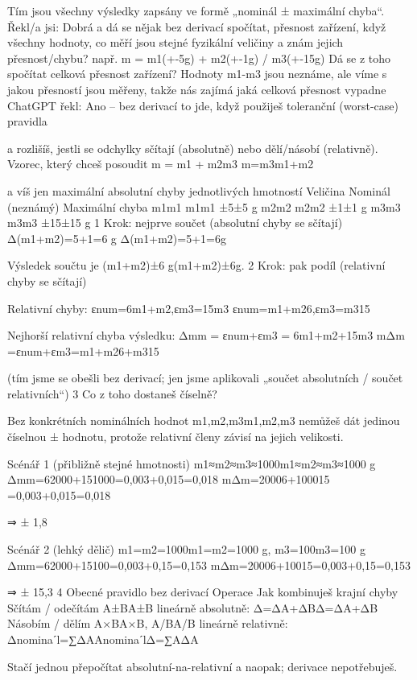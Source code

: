 {Tím jsou všechny výsledky zapsány ve formě „nominál ± maximální chyba“.
Řekl/a jsi:
Dobrá a dá se nějak bez derivací spočítat, přesnost zařízení, když všechny hodnoty, co měří jsou stejné fyzikální veličiny a znám jejich přesnost/chybu? např. m = m1(+-5g) + m2(+-1g) / m3(+-15g) Dá se z toho spočítat celková přesnost zařízení? Hodnoty m1-m3 jsou neznáme, ale víme s jakou přesností jsou měřeny,  takže nás zajímá jaká celková přesnost vypadne
ChatGPT řekl:
Ano – bez derivací to jde, když použiješ toleranční (worst-case) pravidla

a rozlišíš, jestli se odchylky sčítají (absolutně) nebo dělí/násobí (relativně).
Vzorec, který chceš posoudit
m  =  m1  +  m2m3
m=m3​m1​+m2​​

a víš jen maximální absolutní chyby jednotlivých hmotností
Veličina	Nominál (neznámý)	Maximální chyba
m1m1​	m1m1​	±5±5 g
m2m2​	m2m2​	±1±1 g
m3m3​	m3m3​	±15±15 g
1 Krok: nejprve součet (absolutní chyby se sčítají)
Δ(m1+m2)=5+1=6  g
Δ(m1​+m2​)=5+1=6g

Výsledek součtu je (m1+m2)±6  g(m1​+m2​)±6g.
2 Krok: pak podíl (relativní chyby se sčítají)

Relativní chyby:
εnum=6m1+m2,εm3=15m3
εnum​=m1​+m2​6​,εm3​​=m3​15​

Nejhorší relativní chyba výsledku:
Δmm  =  εnum+εm3  =  6m1+m2+15m3
mΔm​=εnum​+εm3​​=m1​+m2​6​+m3​15​​

(tím jsme se obešli bez derivací; jen jsme aplikovali „součet absolutních / součet relativních“)
3 Co z toho dostaneš číselně?

Bez konkrétních nominálních hodnot m1,m2,m3m1​,m2​,m3​ nemůžeš dát jedinou číselnou ± hodnotu, protože relativní členy závisí na jejich velikosti.

Scénář 1 (přibližně stejné hmotnosti)
m1≈m2≈m3≈1000m1​≈m2​≈m3​≈1000 g
Δmm=62000+151000=0,003+0,015=0,018
mΔm​=20006​+100015​=0,003+0,015=0,018

⇒ ± 1,8 %

Scénář 2 (lehký dělič)
m1=m2=1000m1​=m2​=1000 g, m3=100m3​=100 g
Δmm=62000+15100=0,003+0,15=0,153
mΔm​=20006​+10015​=0,003+0,15=0,153

⇒ ± 15,3 %
4 Obecné pravidlo bez derivací
Operace	Jak kombinuješ krajní chyby
Sčítám / odečítám A±BA±B	lineárně absolutně: Δ=ΔA+ΔBΔ=ΔA+ΔB
Násobím / dělím A×BA×B, A/BA/B	lineárně relativně: Δnominaˊl=∑ΔAAnominaˊlΔ​=∑AΔA​

Stačí jednou přepočítat absolutní-na-relativní a naopak; derivace nepotřebuješ.

}
